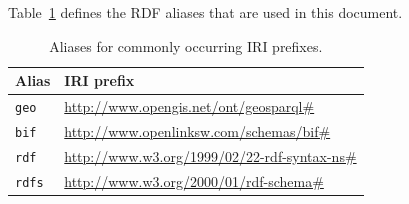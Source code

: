 \documentclass[a4paper]{scrartcl}
\newcommand{\textt}[1]{{\small \texttt{#1}}}
\begin{document}
Table~\ref{tab:alias} defines the RDF aliases that are used in this
document.

\begin{table}
  \centering
  \begin{tabular}{|l|l|}
    \hline
    \textbf{Alias} & \textbf{IRI prefix}\\
    \hline
    \hline
    \textt{geo}    & \url{http://www.opengis.net/ont/geosparql#}\\
    \hline
    \textt{bif}    & \url{http://www.openlinksw.com/schemas/bif#}\\
    \hline
    \textt{rdf}    & \url{http://www.w3.org/1999/02/22-rdf-syntax-ns#}\\
    \hline
    \textt{rdfs}   & \url{http://www.w3.org/2000/01/rdf-schema#}\\
    \hline
  \end{tabular}
  \caption{Aliases for commonly occurring IRI prefixes.}
  \label{tab:alias}
\end{table}
  
\end{document}
